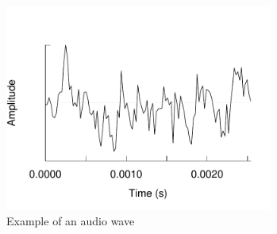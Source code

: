 \begin{figure}[h]
\caption{Example of an audio wave}\label{figure:wave}
\centering
	\includegraphics[height=192pt]{images/pink_audio.pdf}
\end{figure}
